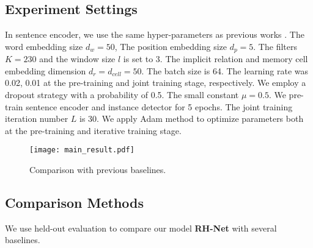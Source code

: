 \documentclass{article}
\begin{document}
\subsection{Experiment Settings}

In sentence encoder, we use the same hyper-parameters as previous works \cite{Zeng2015Distant}. The word embedding size $d_w=50$, The position embedding size $d_p=5$. The filters $K=230$ and the window size $l$ is set to 3. The implicit relation and memory cell embedding dimension $d_r=d_{cell}=50$. The batch size is 64. The learning rate was 0.02, 0.01 at the pre-training and joint training stage, respectively. We employ a dropout strategy with a probability of 0.5. The small constant $\mu=0.5$. We pre-train sentence encoder and instance detector for 5 epochs. The joint training iteration number $L$ is 30. We apply Adam \cite{kingma2014adam} method to optimize parameters both at the pre-training and iterative training stage.

\begin{figure}[t]
\centerline{\texttt{[image: main\_result.pdf]}}
\caption{Comparison with previous baselines.}
\label{main result}
\end{figure}

\subsection{Comparison Methods}

We use held-out evaluation to compare our model \textbf{RH-Net} with several baselines. 
\end{document}
